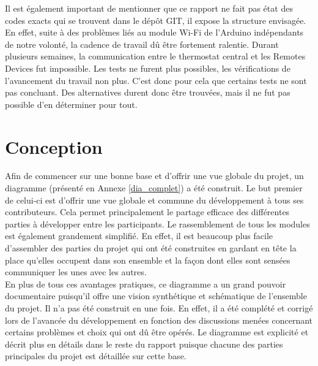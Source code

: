 \documentclass[11pt,a4paper,11pt]{report}
\begin{document}
Il est également important de mentionner que ce rapport ne fait pas état des codes exacts qui se trouvent dans le dépôt GIT, il expose la structure envisagée. En effet, suite à des problèmes liés au module Wi-Fi de l'Arduino indépendants de notre volonté, la cadence de travail dû être fortement ralentie. Durant plusieurs semaines, la communication entre le thermostat central et les Remotes Devices fut impossible. Les tests ne furent plus possibles, les vérifications de l'avancement du travail non plus. C'est donc pour cela que certains tests ne sont pas concluant. Des alternatives durent donc être trouvées, mais il ne fut pas possible d'en déterminer pour tout.\\

\newpage

\chapter{Conception}

Afin de commencer sur une bonne base et d'offrir une vue globale du projet, un diagramme (présenté en Annexe \ref{dia_complet}) a été construit. Le but premier de celui-ci est d'offrir une vue globale et commune du développement à tous ses contributeurs. Cela permet principalement le partage efficace des différentes parties à développer entre les participants. Le rassemblement de tous les modules est également grandement simplifié. En effet, il est beaucoup plus facile d'assembler des parties du projet qui ont été construites en gardant en tête la place qu'elles occupent dans son ensemble et la façon dont elles sont sensées communiquer les unes avec les autres.\\


En plus de tous ces avantages pratiques, ce diagramme a un grand pouvoir documentaire puisqu'il offre une vision synthétique et schématique de l'ensemble du projet.
Il n'a pas été construit en une fois. En effet, il a été complété et corrigé lors de l'avancée du développement en fonction des discussions menées concernant certains problèmes et choix qui ont dû être opérés.
Le diagramme est explicité et décrit plus en détails dans le reste du rapport puisque chacune des parties principales du projet est détaillée sur cette base.
\end{document}
